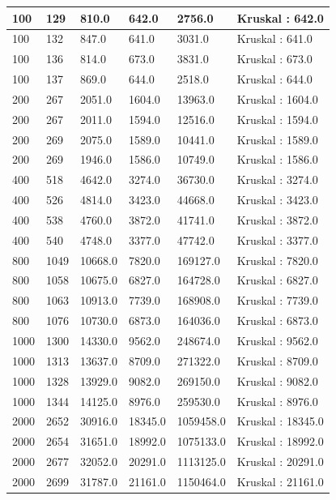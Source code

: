 \begin{longtable}[H]{|p{1.5cm}|p{1.5cm}|p{2cm}|p{2cm}|p{3cm}|p{3cm}|}
    100 & 129 & 810.0 & 642.0 & 2756.0 & Kruskal : 642.0 \\ \hline
    100 & 132 & 847.0 & 641.0 & 3031.0 & Kruskal : 641.0 \\ \hline
    100 & 136 & 814.0 & 673.0 & 3831.0 & Kruskal : 673.0 \\ \hline
    100 & 137 & 869.0 & 644.0 & 2518.0 & Kruskal : 644.0 \\ \hline
    200 & 267 & 2051.0 & 1604.0 & 13963.0 & Kruskal : 1604.0 \\ \hline 
    200 & 267 & 2011.0 & 1594.0 & 12516.0 & Kruskal : 1594.0 \\ \hline 
    200 & 269 & 2075.0 & 1589.0 & 10441.0 & Kruskal : 1589.0 \\ \hline 
    200 & 269 & 1946.0 & 1586.0 & 10749.0 & Kruskal : 1586.0 \\ \hline 
    400 & 518 & 4642.0 & 3274.0 & 36730.0 & Kruskal : 3274.0 \\ \hline 
    400 & 526 & 4814.0 & 3423.0 & 44668.0 & Kruskal : 3423.0 \\ \hline 
    400 & 538 & 4760.0 & 3872.0 & 41741.0 & Kruskal : 3872.0 \\ \hline 
    400 & 540 & 4748.0 & 3377.0 & 47742.0 & Kruskal : 3377.0 \\ \hline 
    800 & 1049 & 10668.0 & 7820.0 & 169127.0 & Kruskal : 7820.0 \\ \hline
    800 & 1058 & 10675.0 & 6827.0 & 164728.0 & Kruskal : 6827.0 \\ \hline
    800 & 1063 & 10913.0 & 7739.0 & 168908.0 & Kruskal : 7739.0 \\ \hline
    800 & 1076 & 10730.0 & 6873.0 & 164036.0 & Kruskal : 6873.0 \\ \hline
    1000 & 1300 & 14330.0 & 9562.0 & 248674.0 & Kruskal : 9562.0 \\ \hline
    1000 & 1313 & 13637.0 & 8709.0 & 271322.0 & Kruskal : 8709.0 \\ \hline
    1000 & 1328 & 13929.0 & 9082.0 & 269150.0 & Kruskal : 9082.0 \\ \hline
    1000 & 1344 & 14125.0 & 8976.0 & 259530.0 & Kruskal : 8976.0 \\ \hline
    2000 & 2652 & 30916.0 & 18345.0 & 1059458.0 & Kruskal : 18345.0 \\ \hline 
    2000 & 2654 & 31651.0 & 18992.0 & 1075133.0 & Kruskal : 18992.0 \\ \hline 
    2000 & 2677 & 32052.0 & 20291.0 & 1113125.0 & Kruskal : 20291.0 \\ \hline 
    2000 & 2699 & 31787.0 & 21161.0 & 1150464.0 & Kruskal : 21161.0 \\ \hline 

\end{longtable}
